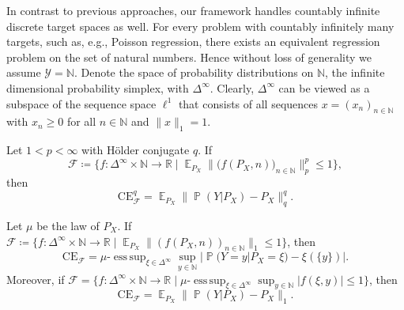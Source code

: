 \documentclass{article}
\DeclareMathOperator{\Prob}{\mathbb{P}}
\DeclareMathOperator{\Exp}{\mathbb{E}}
\DeclareMathOperator*{\esssup}{ess\,sup}
\begin{document}
In contrast to previous approaches, our framework handles countably infinite discrete target spaces
as well. For every problem with countably infinitely many targets, such as, e.g., Poisson regression,
there exists an equivalent regression problem on the set of natural numbers. Hence without loss of generality
we assume $\mathcal{Y} = \mathbb{N}$. Denote the space of probability distributions on $\mathbb{N}$,
the infinite dimensional probability simplex, with $\Delta^\infty$. Clearly, $\Delta^\infty$ can be
viewed as a subspace of the sequence space $\ell^1$ that consists of all sequences $x = (x_n)_{n \in \mathbb{N}}$
with $x_n \geq 0$ for all $n \in \mathbb{N}$ and $\|x\|_{1} = 1$.

\begin{theorem}\label{thm:ece_infinite}
    Let $1 < p < \infty$ with Hölder conjugate $q$. If
    \begin{equation*}
        \mathcal{F} \coloneqq \{f \colon \Delta^{\infty} \times \mathbb{N} \to \mathbb{R} \mid
    \Exp_{P_X} \|\big(f(P_X, n)\big)_{n \in \mathbb{N}}\|_{p}^p \leq 1 \},
    \end{equation*}
    then
    \begin{equation*}
        \mathrm{CE}^q_{\mathcal{F}} = \Exp_{P_X} \|\Prob(Y|P_X) - P_X\|_{q}^q.
    \end{equation*}

    Let $\mu$ be the law of $P_X$. If $\mathcal{F} \coloneqq \{f \colon \Delta^{\infty} \times \mathbb{N} \to \mathbb{R} \mid \Exp_{P_X} \|(f(P_X,n))_{n \in \mathbb{N}}\|_1 \leq 1\}$,
    then
    \begin{equation*}
        \mathrm{CE}_{\mathcal{F}} = \mu\text{-}\esssup_{\xi \in \Delta^{\infty}} \sup_{y \in \mathbb{N}} |\Prob(Y=y|P_X=\xi) - \xi(\{y\})|.
    \end{equation*}
    Moreover, if
    $\mathcal{F} = \{f \colon \Delta^{\infty} \times \mathbb{N} \to \mathbb{R} \mid \mu\text{-}\esssup_{\xi \in \Delta^\infty} \sup_{y \in \mathbb{N}} |f(\xi, y)| \leq 1\}$,
    then
    \begin{equation*}
        \mathrm{CE}_{\mathcal{F}} = \Exp_{P_X} \|\Prob(Y|P_X) - P_X\|_1.
    \end{equation*}
\end{theorem}
\end{document}
